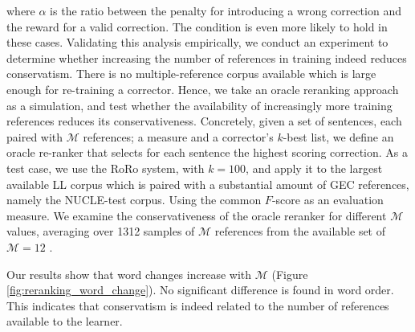 \documentclass[letterpaper, 11pt]{article}
\begin{document}
where $\alpha$ is the ratio between the penalty for introducing a wrong correction and the reward for a valid correction. The condition is even more likely to hold in these cases.
Validating this analysis empirically, we conduct an experiment to determine whether increasing
the number of references in training indeed reduces conservatism. There is no multiple-reference
corpus available which is large enough for re-training a corrector. Hence, we take an oracle reranking approach
as a simulation, and test whether the availability of increasingly more training references reduces its conservativeness.
Concretely, given a set of sentences, each paired with $\mathcal{M}$ references; a measure and a corrector's $k$-best list, we define an oracle re-ranker that selects for each sentence the highest scoring correction.
As a test case, we use the RoRo system, with $k=100$, and apply it to the 
largest available LL corpus which is paired with a substantial amount of GEC references,
namely the NUCLE-test corpus. Using the common $F$-score as an evaluation measure. 
We examine the conservativeness of the oracle reranker for different $\mathcal{M}$ values, averaging over 1312 samples of $\mathcal{M}$ references from the available set of $\mathcal{M}=12$ \cite{bryant2015far}.

Our results show that word changes increase with $\mathcal{M}$ (Figure \ref{fig:reranking_word_change}). No significant difference is found in word order.
This indicates that conservatism is indeed related to the number of references available
to the learner.
\end{document}
